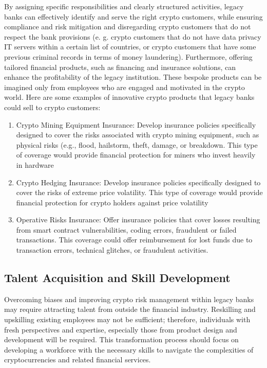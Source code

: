 \documentclass[letterpaper,10pt,english]{jupyterBook}
\begin{document}
\sphinxAtStartPar
By assigning specific responsibilities and clearly structured activities, legacy banks can effectively identify and serve the right crypto customers, while ensuring compliance and risk mitigation and disregarding crypto customers that do not respect the bank provisions (e. g. crypto customers that do not have data privacy IT servers within a certain list of countries, or crypto customers that have some previous criminal records in terms of money laundering). Furthermore, offering tailored financial products, such as financing and insurance solutions, can enhance the profitability of the legacy institution. These bespoke products can be imagined only from employees who are engaged and motivated in the crypto world. Here are some examples of innovative crypto products that legacy banks could sell to crypto customers:
\begin{enumerate}
%
\item {} 
\sphinxAtStartPar
Crypto Mining Equipment Insurance: Develop insurance policies specifically designed to cover the risks associated with crypto mining equipment, such as physical risks (e.g., flood, hailstorm, theft, damage, or breakdown. This type of coverage would provide financial protection for miners who invest heavily in hardware

\item {} 
\sphinxAtStartPar
Crypto Hedging Insurance: Develop insurance policies specifically designed to cover the risks of extreme price volatility. This type of coverage would provide financial protection for crypto holders against price volatility

\item {} 
\sphinxAtStartPar
Operative Risks Insurance: Offer insurance policies that cover losses resulting from smart contract vulnerabilities, coding errors, fraudulent or failed transactions. This coverage could offer reimbursement for lost funds due to transaction errors, technical glitches, or fraudulent activities.

\end{enumerate}


\subsection{Talent Acquisition and Skill Development}
\label{\detokenize{LEGACY/legacy:talent-acquisition-and-skill-development}}
\sphinxAtStartPar
Overcoming biases and improving crypto risk management within legacy banks may require attracting talent from outside the financial industry. Re\sphinxhyphen{}skilling and up\sphinxhyphen{}skilling existing employees may not be sufficient; therefore, individuals with fresh perspectives and expertise, especially those from product design and development will be required. This transformation process should focus on developing a workforce with the necessary skills to navigate the complexities of cryptocurrencies and related financial services.
\end{document}
